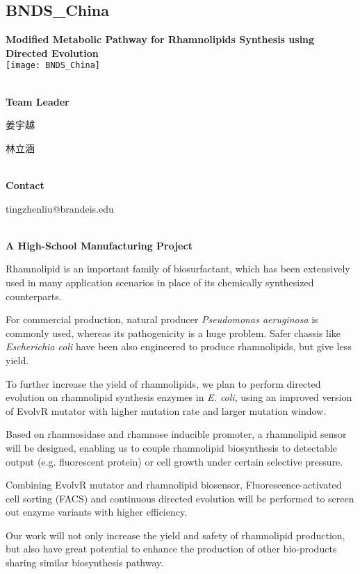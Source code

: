\subsection{\textcolor{Blu}{ BNDS\_China } }
\vspace{5mm}
\begin{center}
\large{
  \textbf{ Modified Metabolic Pathway for Rhamnolipids Synthesis using Directed Evolution }\\

  \texttt{[image: BNDS\_China]}
}
\end{center}
\textbf{\\Team Leader}

  姜宇越

  林立涵


\textbf{\\Contact}

  tingzhenliu@brandeis.edu


\textbf{\\A High-School Manufacturing Project\\}\begin{spacing}{1.5}

Rhamnolipid is an important family of biosurfactant, which has been extensively used in many application scenarios in place of its chemically synthesized counterparts.

For commercial production, natural producer \textit{Pseudomonas aeruginosa} is commonly used, whereas its pathogenicity is a huge problem. Safer chassis like \textit{Escherichia coli} have been also engineered to produce rhamnolipids, but give less yield.

To further increase the yield of rhamnolipids, we plan to perform directed evolution on rhamnolipid synthesis enzymes in \textit{E. coli}, using an improved version of EvolvR mutator with higher mutation rate and larger mutation window.

Based on rhamnosidase and rhamnose inducible promoter, a rhamnolipid sensor will be designed, enabling us to couple rhamnolipid biosynthesis to detectable output (e.g. fluorescent protein) or cell growth under certain selective pressure.

Combining EvolvR mutator and rhamnolipid biosensor, Fluorescence-activated cell sorting (FACS) and continuous directed evolution will be performed to screen out enzyme variants with higher efficiency.

Our work will not only increase the yield and safety of rhamnolipid production, but also have great potential to enhance the production of other bio-products sharing similar biosynthesis pathway.\end{spacing}
\\

